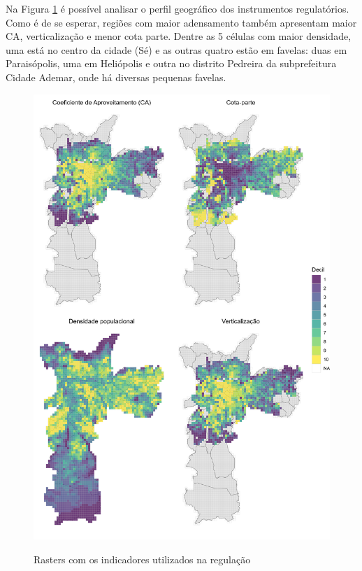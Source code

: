 Na Figura \ref{fig:rasters} é possível analisar o perfil geográfico dos instrumentos regulatórios. Como é de se esperar, regiões com maior adensamento também apresentam maior CA, verticalização e menor cota parte. Dentre as 5 células com maior densidade, uma está no centro da cidade (Sé) e as outras quatro estão em favelas: duas em Paraisópolis, uma em Heliópolis e outra no distrito Pedreira da subprefeitura Cidade Ademar, onde há diversas pequenas favelas. 

\begin{figure}[h]
    \centering
    \caption{Rasters com os indicadores utilizados na regulação}
    \includegraphics[width = \linewidth]{imagens/rasters.png}
    \label{fig:rasters}
\end{figure}

